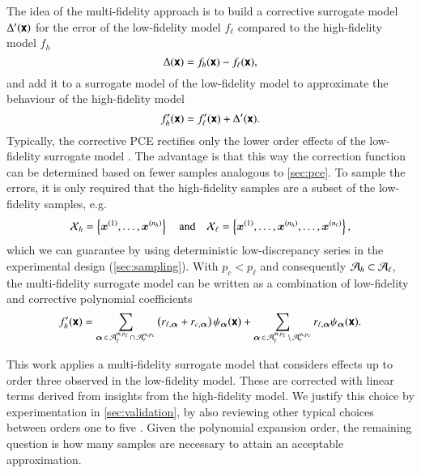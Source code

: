 
The idea of the multi-fidelity approach is to build a corrective surrogate model $\Delta'(\boldsymbol{\mathsf{x}})$ for the
error of the low-fidelity model $f_\ell$ compared to the high-fidelity model $f_h$ 
\begin{equation}
    \Delta(\boldsymbol{\mathsf{x}}) = f_h(\boldsymbol{\mathsf{x}}) - f_\ell(\boldsymbol{\mathsf{x}}),
\end{equation}
and add it to a surrogate model of the low-fidelity model to approximate the behaviour of the
high-fidelity model
\begin{equation}
    f_h'(\boldsymbol{\mathsf{x}}) = f_\ell'(\boldsymbol{\mathsf{x}}) + \Delta'(\boldsymbol{\mathsf{x}}).
\end{equation}
Typically, the corrective PCE rectifies only the lower order effects
of the low-fidelity surrogate model \cite{palar_multi-fidelity_2016}.
The advantage is that this way the correction function can be determined
based on fewer samples analogous to \cref{sec:pce}.
To sample the errors, it is only required that the
high-fidelity samples are a subset of the low-fidelity samples, e.g.
\begin{equation}
    \mathcal{X}_h = \left\{ \bm{x}^{(1)}, \dots, \bm{x}^{(n_h)}\right\} \quad\text{and}\quad
    \mathcal{X}_\ell = \left\{ \bm{x}^{(1)}, \dots, \bm{x}^{(n_h)}, \dots, \bm{x}^{(n_\ell)}\right\},
\end{equation}
which we can guarantee by using deterministic low-discrepancy series
in the experimental design (\cref{sec:sampling}).
With $p_c < p_\ell$ and consequently $\mathcal{A}_h \subset \mathcal{A}_\ell$,
the multi-fidelity surrogate model can be written as a combination of low-fidelity
and corrective polynomial coefficients
\begin{equation}
    f_h' (\boldsymbol{\mathsf{x}}) = \sum_{{\bm{\alpha}}\,\in\,\mathcal{A}_\ell^{m,p_\ell} \,\cap\, \mathcal{A}_r^{m,p_c}}
    \left(
     r_{\ell,{\bm{\alpha}}} + r_{c,{\bm{\alpha}}}
    \right) \psi_{\bm{\alpha}}(\boldsymbol{\mathsf{x}}) + 
    \sum_{{\bm{\alpha}}\,\in\,\mathcal{A}_\ell^{m,p_\ell} \,\setminus\, \mathcal{A}_r^{m,p_c}}
    r_{\ell,{\bm{\alpha}}} \psi_{\bm{\alpha}}(\boldsymbol{\mathsf{x}}).
\end{equation}


This work applies a multi-fidelity surrogate model that considers
effects up to order three observed in the low-fidelity model. These are corrected with linear terms derived from insights from the high-fidelity model.
We justify this choice by experimentation in \cref{sec:validation},
by also reviewing other typical choices between orders one to five \cite{gratiet_metamodel-based_2015}.
Given the polynomial expansion order, the remaining question is how many samples are necessary to attain an acceptable approximation.


